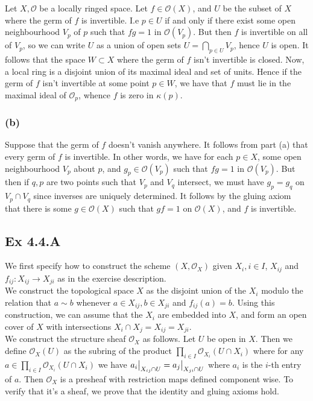 \documentclass{article}
\newcommand\restr[2]{{%
  \left.\kern-\nulldelimiterspace %
  #1 %
  \vphantom{\big|} %
  \right|_{#2} %
  }}
\theoremstyle{definition}
\newcommand{\oo}{\mathcal{O}}
\begin{document}
Let $X, \oo$ be a locally ringed space. Let $f \in \oo(X)$, and $U$ be the
subset of $X$ where the germ of $f$ is invertible. I.e $p \in U$ if and only if
there exist some open neighbourhood $V_p$ of $p$ such that $fg = 1$ in
$\oo(V_p)$. But then $f$ is invertible on all of $V_p$, so we can write $U$ as
a union of open sets $U = \bigcap_{p \in U} V_p$, hence $U$ is open. It follows
that the space $W \subset X$ where the germ of $f$ isn't invertible is closed.
Now, a local ring is a disjoint union of its maximal ideal and set of units.
Hence if the germ of $f$ isn't invertible at some point $p \in W$, we have that
$f$ must lie in the maximal ideal of $\mathcal{O}_p$, whence $f$ is zero in
$\kappa(p)$.

\subsubsection*{(b)}

Suppose that the germ of $f$ doesn't vanish anywhere. It follows from part (a)
that every germ of $f$ is invertible. In other words, we have for each $p \in
X$, some open neighbourhood $V_p$ about $p$, and $g_p \in \oo(V_p)$ such that
$fg = 1$ in $\oo(V_p)$. But then if $q, p$ are two points such that $V_p$ and
$V_q$ intersect, we must have $g_p = g_q$ on $V_p \cap V_q$ since inverses are
uniquely determined. It follows by the gluing axiom that there is some $g \in
\oo(X)$ such that $gf = 1$ on $\oo(X)$, and $f$ is invertible.

\subsection*{Ex 4.4.A}


We first specify how to construct the scheme $(X, \mathcal{O}_X)$ given $X_i, i
\in I$, $X_{ij}$ and $f_{ij} : X_{ij} \to X_{ji}$ as in the exercise
description. \\

We construct the topological space $X$ as the disjoint union of the $X_i$
modulo the relation that $a \sim b$ whenever $a \in X_{ij}, b \in X_{ji}$ and
$f_{ij}(a) = b$. Using this construction, we can assume that the $X_i$ are
embedded into $X$, and form an open cover of $X$ with intersections $X_i \cap
X_j = X_{ij} = X_{ji}$. \\

We construct the structure sheaf $\mathcal{O}_{X}$ as follows. Let $U$ be open
in $X$. Then we define $\oo_X(U)$ as the subring of the product $\prod_{i \in
I} \oo_{X_i}(U \cap X_i)$ where for any $a \in \prod_{i \in I} \oo_{X_i}(U \cap
X_i)$ we have $\restr{a_i}{X_{ij} \cap U} = \restr{a_j}{X_{ji} \cap U}$ where
$a_i$ is the $i$-th entry of $a$. Then $\mathcal{O}_X$ is a presheaf with
restriction maps defined component wise. To verify that it's a sheaf, we prove
that the identity and gluing axioms hold. \\
\end{document}
